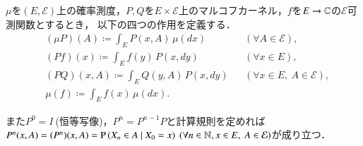 	\begin{dfn}[作用の定義]
		$\mu$を$(E,\mathcal{E})$上の確率測度，$P,Q$を$E \times \mathcal{E}$上のマルコフカーネル，$f$を$E \rightarrow \mathbb{C}$の$\mathcal{E}$可測関数とするとき，
		以下の四つの作用を定義する．
		\begin{align}
			& (\mu P)(A) \coloneqq \int_{E} P(x,A)\, \mu(dx) && (\forall A \in \mathcal{E}), \\
			& (Pf) (x) \coloneqq \int_{E} f(y)\, P(x, dy) && (\forall x \in E), \\
			& (PQ) (x,A) \coloneqq \int_{E} Q(y,A)\, P(x, dy) && (\forall x \in E,\ A \in \mathcal{E}), \\
			& \mu(f) \coloneqq \int_{E} f(x)\, \mu(dx).
		\end{align}
	\end{dfn}
	また$P^0=I\ $(恒等写像)，$P^n=P^{n-1}P$と計算規則を定めれば$P^n(x,A)=(P^n)(x,A)=\cprob{X_n \in A}{X_0 = x}\ (\forall n \in \N, x \in E,\ A \in \mathcal{E})$が成り立つ．
